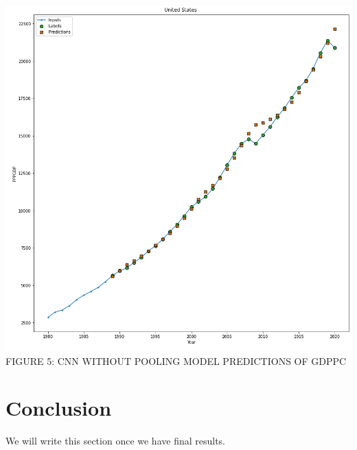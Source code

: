 \documentclass[final]{cvpr}
\begin{document}
\begin{center}
        \includegraphics[scale=0.27]{images/CNNFiller.png}
        {\small
            FIGURE 5: CNN WITHOUT POOLING MODEL PREDICTIONS OF GDPPC
        }
    \end{center}



\section{Conclusion}

We will write this section once we have final results.

\nocite{*}

{\small
    
    
}
\end{document}
